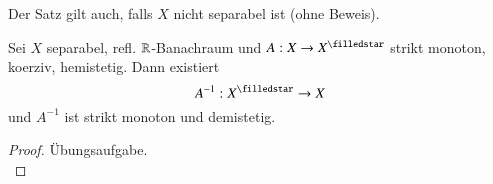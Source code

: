 \begin{remark}
    Der Satz gilt auch, falls $X$ nicht separabel ist (ohne Beweis).
\end{remark}

\begin{cor}\label{4.7}
    Sei $X$ separabel, refl. $\mathbb{R}$-Banachraum und $A:X\ra X^\star$ strikt monoton, koerziv, hemistetig.
    Dann existiert
    \[
        A^{-1}:X^\star\ra X
    \]
    und $A^{-1}$ ist strikt monoton und demistetig.
\end{cor}

\begin{proof}
    Übungsaufgabe. \[ \]
\end{proof}
